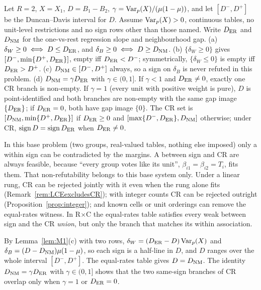 \begin{proposition}\label{prop:tworowsign}
Let $R=2$, $X=X_1$, $D=B_1-B_2$, $\gamma=\operatorname{Var}_p(X)/(\mu(1-\mu))$, and let
$[D^-,D^+]$ be the Duncan--Davis interval for $D$. Assume $\operatorname{Var}_p(X)>0$, continuous
tables, no unit-level restrictions and no sign rows other than those named. Write
$D_{\mathrm{ER}}$ and $D_{\mathrm{NM}}$ for the one-vs-rest regression slope and neighbourhood
gap.
(a) $\delta_W\ge0\iff D\le D_{\mathrm{ER}}$, and $\delta_B\ge0\iff D\ge D_{\mathrm{NM}}$.
(b) $\{\delta_W\ge0\}$ gives $[D^-,\min\{D^+,D_{\mathrm{ER}}\}]$, empty iff $D_{\mathrm{ER}}<D^-$;
symmetrically, $\{\delta_W\le0\}$ is empty iff $D_{\mathrm{ER}}>D^+$.
(c) $D_{\mathrm{NM}}\in[D^-,D^+]$ always, so a sign on $\delta_B$ is never refuted in this
problem.
(d) $D_{\mathrm{NM}}=\gamma D_{\mathrm{ER}}$ with $\gamma\in(0,1]$. If $\gamma<1$ and
$D_{\mathrm{ER}}\ne0$, exactly one CR branch is non-empty. If $\gamma=1$ (every unit with
positive weight is pure), $D$ is point-identified and both branches are non-empty
with the same gap image $\{D_{\mathrm{ER}}\}$; if $D_{\mathrm{ER}}=0$, both have gap image $\{0\}$.
The CR set is $[D_{\mathrm{NM}},\min\{D^+,D_{\mathrm{ER}}\}]$ if $D_{\mathrm{ER}}\ge0$ and
$[\max\{D^-,D_{\mathrm{ER}}\},D_{\mathrm{NM}}]$ otherwise; under CR,
$\operatorname{sign} D=\operatorname{sign} D_{\mathrm{ER}}$ when $D_{\mathrm{ER}}\neq0$.
\end{proposition}
\begin{reading}
In this base problem (two groups, real-valued tables, nothing else imposed) only a
within sign can be contradicted by the margins. A between sign and CR are always
feasible, because ``every group votes like its unit'', $\beta_{i1}=\beta_{i2}=T_i$,
fits them. That non-refutability belongs to this base system only. Under a linear
rung, CR can be rejected jointly with it even when the rung alone fits
(Remark~\ref{rem:LCEexcludesCR}); with integer counts CR can be rejected outright
(Proposition~\ref{prop:integer}); and known cells or unit orderings can remove the
equal-rates witness. In R$\times$C the equal-rates table satisfies every weak
between sign and the CR \emph{union}, but only the branch that matches its within
association.
\end{reading}
\begin{sketch}
By Lemma~\ref{lem:M1}(c) with two rows, $\delta_W=(D_{\mathrm{ER}}-D)\operatorname{Var}_p(X)$ and
$\delta_B=(D-D_{\mathrm{NM}})\mu(1-\mu)$, so each sign is a half-line in $D$, and $D$ ranges
over the whole interval $[D^-,D^+]$. The equal-rates table gives $D=D_{\mathrm{NM}}$. The
identity $D_{\mathrm{NM}}=\gamma D_{\mathrm{ER}}$ with $\gamma\in(0,1]$ shows that the two
same-sign branches of CR overlap only when $\gamma=1$ or $D_{\mathrm{ER}}=0$.
\end{sketch}

